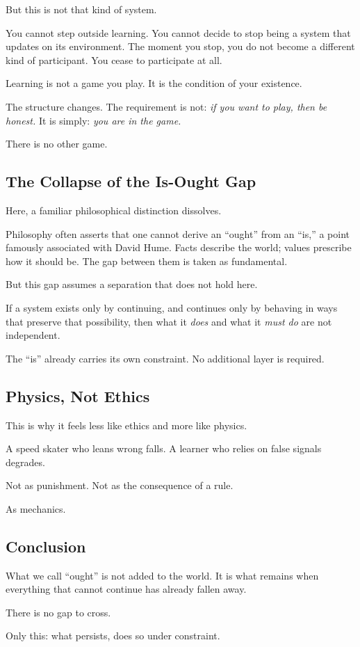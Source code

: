\documentclass{article}
\begin{document}
But this is not that kind of system.

You cannot step outside learning. You cannot decide to stop being a system that updates on its environment. The moment you stop, you do not become a different kind of participant. You cease to participate at all.

Learning is not a game you play. It is the condition of your existence.

The structure changes. The requirement is not: \textit{if you want to play, then be honest.}
It is simply: \textit{you are in the game.}

There is no other game.

\subsection*{The Collapse of the Is-Ought Gap}

Here, a familiar philosophical distinction dissolves.

Philosophy often asserts that one cannot derive an ``ought'' from an ``is,'' a point famously associated with David Hume. Facts describe the world; values prescribe how it should be. The gap between them is taken as fundamental.

But this gap assumes a separation that does not hold here.

If a system exists only by continuing, and continues only by behaving in ways that preserve that possibility, then what it \textit{does} and what it \textit{must do} are not independent.

The ``is'' already carries its own constraint. No additional layer is required.

\subsection*{Physics, Not Ethics}

This is why it feels less like ethics and more like physics.

A speed skater who leans wrong falls. A learner who relies on false signals degrades.

Not as punishment. Not as the consequence of a rule.

As mechanics.

\subsection*{Conclusion}

What we call ``ought'' is not added to the world. It is what remains when everything that cannot continue has already fallen away.

There is no gap to cross.

Only this: what persists, does so under constraint.
\end{document}
